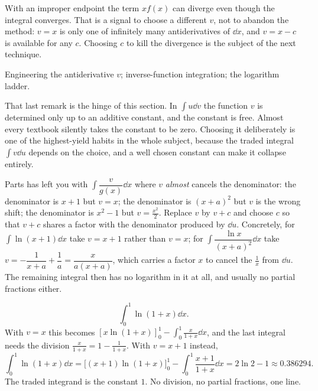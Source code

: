 \begin{trap}
With an improper endpoint the term $xf(x)$ can diverge even though the integral converges. That is a signal to choose a different $v$, not to abandon the method: $v=x$ is only one of infinitely many antiderivatives of $\dd x$, and $v=x-c$ is available for any $c$. Choosing $c$ to kill the divergence is the subject of the next technique.
\end{trap}

\begin{seealsob}Engineering the antiderivative $v$; inverse-function integration; the logarithm ladder.\end{seealsob}

That last remark is the hinge of this section. In $\int u\dd v$ the function $v$ is determined only up to an additive constant, and the constant is free. Almost every textbook silently takes the constant to be zero. Choosing it deliberately is one of the highest-yield habits in the whole subject, because the traded integral $\int v\dd u$ depends on the choice, and a well chosen constant can make it collapse entirely.

\cue Parts has left you with $\int \dfrac{v}{g(x)}\dd x$ where $v$ \emph{almost} cancels the denominator: the denominator is $x+1$ but $v=x$; the denominator is $(x+a)^{2}$ but $v$ is the wrong shift; the denominator is $x^{2}-1$ but $v=\tfrac{x^{2}}{2}$.
\method Replace $v$ by $v+c$ and choose $c$ so that $v+c$ shares a factor with the denominator produced by $\dd u$. Concretely, for $\int\ln(x+1)\dd x$ take $v=x+1$ rather than $v=x$; for $\int\dfrac{\ln x}{(x+a)^{2}}\dd x$ take $v=-\dfrac{1}{x+a}+\dfrac1a=\dfrac{x}{a(x+a)}$, which carries a factor $x$ to cancel the $\tfrac1x$ from $\dd u$. The remaining integral then has no logarithm in it at all, and usually no partial fractions either.

\begin{worked}
\[\int_0^1\ln(1+x)\dd x.\]
With $v=x$ this becomes $[x\ln(1+x)]_0^1-\int_0^1\tfrac{x}{1+x}\dd x$, and the last integral needs the division $\tfrac{x}{1+x}=1-\tfrac{1}{1+x}$. With $v=x+1$ instead,
\[\int_0^1\ln(1+x)\dd x=\bigl[(x+1)\ln(1+x)\bigr]_0^1-\int_0^1\frac{x+1}{1+x}\dd x=2\ln2-1\approx0.386294.\]
The traded integrand is the constant $1$. No division, no partial fractions, one line.
\end{worked}

